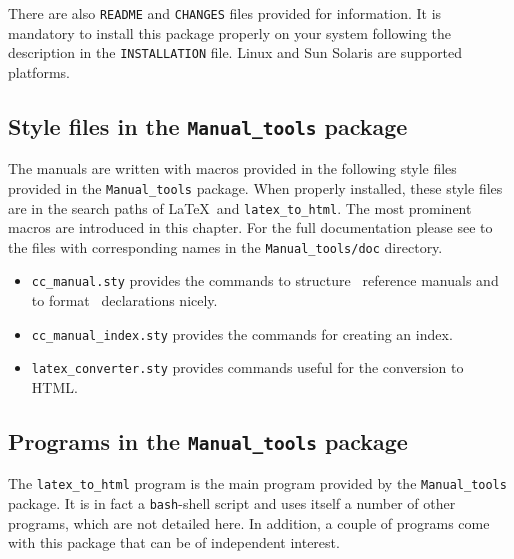 There are also \texttt{README} and \texttt{CHANGES} files provided for
information. It is mandatory to install this package properly on your
system following the description in the \texttt{INSTALLATION} file. Linux
and Sun Solaris are supported platforms.

\subsection{Style files in the \texttt{Manual\_tools} package}
\label{subsec:manual_tools_style_files}

The manuals are written with macros provided in the following style
files provided in the \texttt{Manual\_tools} package. When properly
installed, these style files are in the search paths of \LaTeX\ and
\texttt{latex\_to\_html}. The most prominent macros are introduced in
this chapter. For the full documentation please see to the files with
corresponding names in the \texttt{Manual\_tools/doc}
directory.

\begin{itemize}
   \item {\tt cc\_manual.sty}
       provides the commands to structure \CC\ reference manuals
       and to format \CC\ declarations nicely.
   \item {\tt cc\_manual\_index.sty} provides the commands for creating an
       index.
   \item {\tt latex\_converter.sty}
       provides commands useful for the conversion to HTML.
\end{itemize}


\subsection{Programs in the \texttt{Manual\_tools} package}
\label{subsec:manual_tools_programs}

The \texttt{latex\_to\_html} program is the main program provided by
the \texttt{Manual\_tools} package. It is in fact a
\texttt{bash}-shell script and uses itself a number of other programs,
which are not detailed here. In addition, a couple of programs
come with this package that can be of independent interest.

